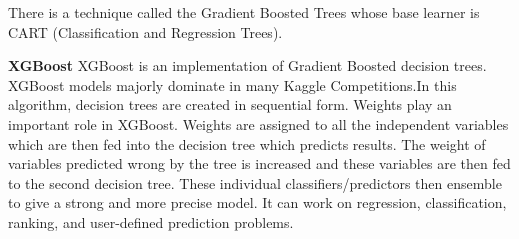 \documentclass[12pt]{article}
\begin{document}
There is a technique called the Gradient Boosted Trees whose base learner is CART (Classification and Regression Trees).

\textbf{XGBoost }
XGBoost is an implementation of Gradient Boosted decision trees. XGBoost models majorly dominate in many Kaggle Competitions.In this algorithm, decision trees are created in sequential form. Weights play an important role in XGBoost. Weights are assigned to all the independent variables which are then fed into the decision tree which predicts results. The weight of variables predicted wrong by the tree is increased and these variables are then fed to the second decision tree. These individual classifiers/predictors then ensemble to give a strong and more precise model. It can work on regression, classification, ranking, and user-defined prediction problems.
\end{document}
